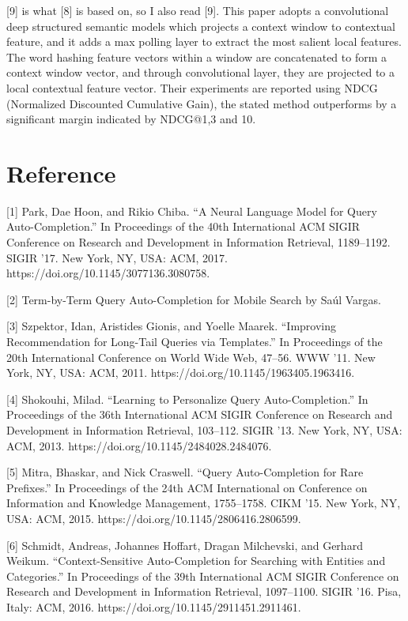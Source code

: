 \documentclass[12pt]{article} %
\begin{document}
[9] is what [8] is based on, so I also read [9]. This paper adopts a convolutional deep structured semantic models which projects a context window to contextual feature, and it adds a max polling layer to extract the most salient local features. The word hashing feature vectors within a window are concatenated to form a context window vector, and through convolutional layer, they are projected to a local contextual feature vector. Their experiments are reported using NDCG (Normalized Discounted Cumulative Gain), the stated method outperforms by a significant margin indicated by NDCG@1,3 and 10.

\section{Reference}
{\setlength{\parindent}{0cm}
[1] Park, Dae Hoon, and Rikio Chiba. “A Neural Language Model for Query Auto-Completion.” In Proceedings of the 40th International ACM SIGIR Conference on Research and Development in Information Retrieval, 1189–1192. SIGIR ’17. New York, NY, USA: ACM, 2017. https://doi.org/10.1145/3077136.3080758.

[2] Term-by-Term Query Auto-Completion for Mobile Search by Saúl Vargas.

[3] Szpektor, Idan, Aristides Gionis, and Yoelle Maarek. “Improving Recommendation for Long-Tail Queries via Templates.” In Proceedings of the 20th International Conference on World Wide Web, 47–56. WWW ’11. New York, NY, USA: ACM, 2011. https://doi.org/10.1145/1963405.1963416.

[4] Shokouhi, Milad. “Learning to Personalize Query Auto-Completion.” In Proceedings of the 36th International ACM SIGIR Conference on Research and Development in Information Retrieval, 103–112. SIGIR ’13. New York, NY, USA: ACM, 2013. https://doi.org/10.1145/2484028.2484076.

[5] Mitra, Bhaskar, and Nick Craswell. “Query Auto-Completion for Rare Prefixes.” In Proceedings of the 24th ACM International on Conference on Information and Knowledge Management, 1755–1758. CIKM ’15. New York, NY, USA: ACM, 2015. https://doi.org/10.1145/2806416.2806599.

[6] Schmidt, Andreas, Johannes Hoffart, Dragan Milchevski, and Gerhard Weikum. “Context-Sensitive Auto-Completion for Searching with Entities and Categories.” In Proceedings of the 39th International ACM SIGIR Conference on Research and Development in Information Retrieval, 1097–1100. SIGIR ’16. Pisa, Italy: ACM, 2016. https://doi.org/10.1145/2911451.2911461.

}
\end{document}
